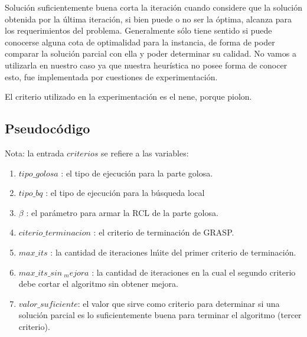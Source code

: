 \vspace{2mm}

Soluci\'on suficientemente buena corta la iteraci\'on cuando considere que la soluci\'on obtenida por la \'ultima iteraci\'on, si bien puede o no ser la \'optima, alcanza para los requerimientos del problema. Generalmente s\'olo tiene sentido si puede conocerse alguna cota de optimalidad para la instancia, de forma de poder comparar la soluci\'on parcial con ella y poder determinar su calidad. No vamos a utilizarla en nuestro caso ya que nuestra heur\'istica no posee forma de conocer esto, fue implementada por cuestiones de experimentaci\'on.

\vspace{2mm}

El criterio utilizado en la experimentaci\'on es el nene, porque piolon.

\subsection{Pseudoc\'odigo}

Nota: la entrada $criterios$ se refiere a las variables:

\begin{enumerate}
\item $tipo\_golosa$ : el tipo de ejecuci\'on para la parte golosa.
\item $tipo\_bq$ : el tipo de ejecuci\'on para la b\'usqueda local
\item $\beta$ : el par\'ametro para armar la RCL de la parte golosa.
\item $citerio\_terminacion$ : el criterio de terminaci\'on de GRASP.
\item $max\_its$ : la cantidad de iteraciones l\'mite del primer criterio de terminaci\'on.
\item $max\_its\_sin\ _mejora$ : la cantidad de iteraciones en la cual el segundo criterio debe cortar el algoritmo sin obtener mejora.
\item $ valor\_suficiente $: el valor que sirve como criterio para determinar si una soluci\'on parcial es lo suficientemente buena para terminar el algoritmo (tercer criterio).
\end{enumerate}

